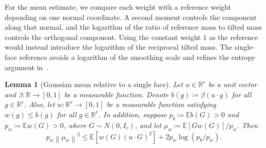 \documentclass[11pt,letterpaper]{article}
\newtheorem{lemma}{Lemma}
\theoremstyle{remark}
\newcommand{\E}{\mathbb E}
\newcommand{\R}{\mathbb R}
\newcommand{\norm}[1]{\left\lVert#1\right\rVert}
\begin{document}
For the mean estimate, we compare each weight with a reference weight
depending on one normal coordinate. A second moment controls the
component along that normal, and the logarithm of the ratio of
reference mass to tilted mass controls the orthogonal component.
Using the constant weight \(1\) as the reference would instead introduce
the logarithm of the reciprocal tilted mass. The single-face reference
avoids a logarithm of the smoothing scale and refines the entropy argument
in~\cite[Lemma~12]{GaoZhang}.

\begin{lemma}[Gaussian mean relative to a single face]
\label{appx-an:lem:mean}
Let \(u\in\R^r\) be a unit vector and
\(\beta:\R\to[0,1]\) be a measurable function. Denote
\(b(g)\coloneqq\beta(u\cdot g)\) for all \(g\in\R^r\).
Also, let \(w:\R^r\to[0,1]\) be a measurable function
satisfying \(w(g)\le b(g)\) for all $g\in\R^r$.
In addition, suppose \(p_b\coloneqq\E b(G)>0\) and
\(p_w\coloneqq\E w(G)>0\), where \(G\sim N(0,I_r)\),
and let \(\mu_w\coloneqq\E[Gw(G)]/p_w\). Then
\begin{equation}
 p_w\norm{\mu_w}^2
 \le \E[w(G)(u\cdot G)^2]
        +2p_w\log(p_b/p_w).
 \label{appx-an:mean-entropy}
\end{equation}
\end{lemma}
\end{document}
